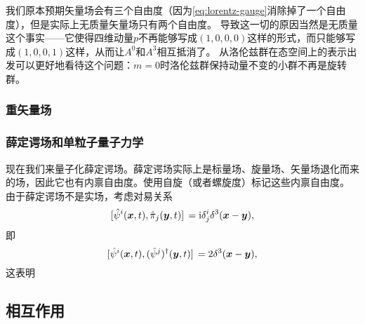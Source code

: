 \documentclass[hyperref, UTF8, a4paper]{ctexart}
\newcommand*{\ii}{\mathrm{i}}
\begin{document}
我们原本预期矢量场会有三个自由度（因为\eqref{eq:lorentz-gauge}消除掉了一个自由度），但是实际上无质量矢量场只有两个自由度。
导致这一切的原因当然是无质量这个事实——它使得四维动量$p$不再能够写成$(1, 0, 0, 0)$这样的形式，而只能够写成$(1,0,0,1)$这样，从而让$A^0$和$A^3$相互抵消了。
从洛伦兹群在态空间上的表示出发可以更好地看待这个问题：$m=0$时洛伦兹群保持动量不变的小群不再是旋转群。



\subsubsection{重矢量场}

\subsubsection{薛定谔场和单粒子量子力学}

现在我们来量子化薛定谔场。薛定谔场实际上是标量场、旋量场、矢量场退化而来的场，因此它也有内禀自由度。使用自旋（或者螺旋度）标记这些内禀自由度。
由于薛定谔场不是实场，考虑对易关系
\[
    \comm*{\hat{\psi}^i(\vb*{x}, t)}{\hat{\pi}_j(\vb*{y}, t)} = \ii \delta^i_j \delta^3 (\vb*{x} - \vb*{y}),
\]
即
\[
    \comm*{\hat{\psi}^i(\vb*{x}, t)}{(\hat{\psi}^j)^\dagger (\vb*{y}, t)} = 2 \delta^3 (\vb*{x} - \vb*{y}),
\]
这表明

\subsection{相互作用}
\end{document}
